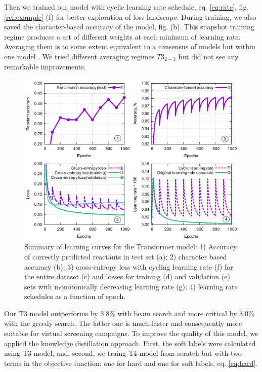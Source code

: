 \documentclass{article}
\begin{document}
Then we trained our model with cyclic learning rate schedule, eq. \ref{eq:rate}, fig. \ref{ref:example} (f) for better exploration of loss landscape. During training, we also saved the character-based accuracy of the model, fig. (b). This snapshot training regime \cite{Snapshot} produces a set of different weights at each minimum of learning rate. Averaging them is to some extent equivalent to a consensus of models but within one model \cite{Izmailov}. We tried different averaging regimes $T3_{2-3}$ but did not see any remarkable improvements. 
\begin{figure}[t!]
  \centering
  \includegraphics[width = 17cm]{images/learning.pdf}
  \caption{Summary of learning curves for the Transformer model: 1) Accuracy of correctly predicted reactants in test set (a); 2) character based accuracy (b); 3) cross-entropy loss with cycling learning rate (f) for the entire dataset (c) and losses for training (d) and validation (e) sets with monotonically decreasing learning rate (g); 4) learning rate schedules as a function of epoch.}
  \label{fig:example}
\end{figure}

Our T3 model outperforms \cite{Pande} by 3.8\% with beam search and more critical by 3.0\% with the greedy search. The latter one is much faster and consequently more suitable for virtual screening campaigns. To improve the quality of this model, we applied the knowledge distillation approach. First, the soft labels were calculated using T3 model, and, second, we traing T4 model from scratch but with two terms in the objective function: one for hard and one for soft labels, eq. \ref{eq:hard}. 
\end{document}
